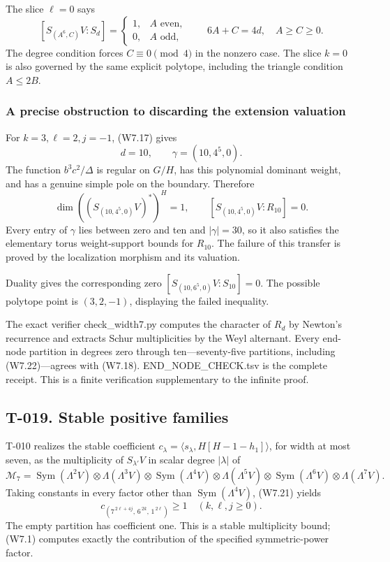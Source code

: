 \documentclass[
  10pt,
]{article}
\begin{document}
The slice \(\ell=0\) says \[
[S_{(A^6,C)}V:S_d]
=\begin{cases}1,&A\text{ even},\\0,&A\text{ odd},\end{cases}
\qquad 6A+C=4d,\quad A\ge C\ge0.
\] The degree condition forces \(C\equiv0\pmod4\) in the nonzero case.
The slice \(k=0\) is also governed by the same explicit polytope,
including the triangle condition \(A\le2B\).

\subsubsection{A precise obstruction to discarding the extension
valuation}\label{a-precise-obstruction-to-discarding-the-extension-valuation}

For \(k=3,\ell=2,j=-1\), (W7.17) gives \[
d=10,\qquad \gamma=(10,4^5,0).
\] The function \(b^3c^2/\Delta\) is regular on \(G/H\), has this
polynomial dominant weight, and has a genuine simple pole on the
boundary. Therefore \[
\dim((S_{(10,4^5,0)}V)^*)^H=1,\qquad
[S_{(10,4^5,0)}V:R_{10}]=0.
\tag{W7.22}
\] Every entry of \(\gamma\) lies between zero and ten and
\(|\gamma|=30\), so it also satisfies the elementary torus
weight-support bounds for \(R_{10}\). The failure of this transfer is
proved by the localization morphism and its valuation.

Duality gives the corresponding zero \([S_{(10,6^5,0)}V:S_{10}]=0\). The
possible polytope point is \((3,2,-1)\), displaying the failed
inequality.

The exact verifier check\_width7.py computes the character of \(R_d\) by
Newton's recurrence and extracts Schur multiplicities by the Weyl
alternant. Every end-node partition in degrees zero through
ten---seventy-five partitions, including (W7.22)---agrees with (W7.18).
END\_NODE\_CHECK.tsv is the complete receipt. This is a finite
verification supplementary to the infinite proof.

\subsection{T-019. Stable positive
families}\label{t-019.-stable-positive-families}

T-010 realizes the stable coefficient
\(c_\lambda=\langle s_\lambda,H[H-1-h_1]\rangle\), for width at most
seven, as the multiplicity of \(S_{\lambda'}V\) in scalar degree
\(|\lambda|\) of \[
\mathcal M_7=
\operatorname{Sym}(\Lambda^2V)\otimes
\Lambda(\Lambda^3V)\otimes
\operatorname{Sym}(\Lambda^4V)\otimes
\Lambda(\Lambda^5V)\otimes
\operatorname{Sym}(\Lambda^6V)\otimes
\Lambda(\Lambda^7V).
\] Taking constants in every factor other than
\(\operatorname{Sym}(\Lambda^4V)\), (W7.21) yields \[
\boxed{c_{(7^{\,2\ell+4j},\,6^{\,2k},\,1^{\,2\ell})}\ge1
\quad(k,\ell,j\ge0).}
\tag{W7.23}
\] The empty partition has coefficient one. This is a stable
multiplicity bound; (W7.1) computes exactly the contribution of the
specified symmetric-power factor.
\end{document}
